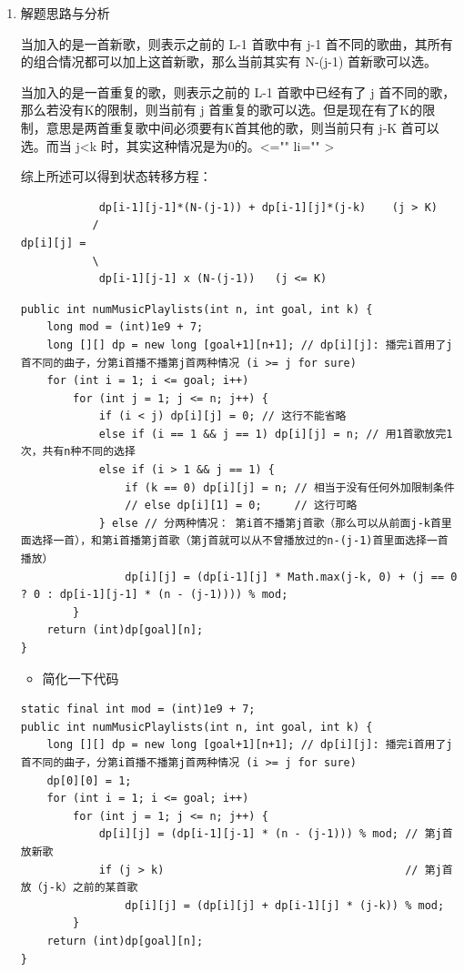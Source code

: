 \documentclass[9pt, b5paaper]{book}
\begin{document}
\begin{enumerate}
\item 解题思路与分析
\label{sec-1-5-1-1}

当加入的是一首新歌，则表示之前的 L-1 首歌中有 j-1 首不同的歌曲，其所有的组合情况都可以加上这首新歌，那么当前其实有 N-(j-1) 首新歌可以选。

当加入的是一首重复的歌，则表示之前的 L-1 首歌中已经有了 j 首不同的歌，那么若没有K的限制，则当前有 j 首重复的歌可以选。但是现在有了K的限制，意思是两首重复歌中间必须要有K首其他的歌，则当前只有 j-K 首可以选。而当 j<k 时，其实这种情况是为0的。<="" li="" >

综上所述可以得到状态转移方程：

\begin{verbatim}
            dp[i-1][j-1]*(N-(j-1)) + dp[i-1][j]*(j-k)    (j > K)	
           /	
dp[i][j] = 	
           \	
            dp[i-1][j-1] x (N-(j-1))   (j <= K)
\end{verbatim}
\begin{verbatim}
public int numMusicPlaylists(int n, int goal, int k) {
    long mod = (int)1e9 + 7;
    long [][] dp = new long [goal+1][n+1]; // dp[i][j]: 播完i首用了j首不同的曲子，分第i首播不播第j首两种情况 (i >= j for sure)
    for (int i = 1; i <= goal; i++) 
        for (int j = 1; j <= n; j++) {
            if (i < j) dp[i][j] = 0; // 这行不能省略   
            else if (i == 1 && j == 1) dp[i][j] = n; // 用1首歌放完1次，共有n种不同的选择
            else if (i > 1 && j == 1) {
                if (k == 0) dp[i][j] = n; // 相当于没有任何外加限制条件
                // else dp[i][1] = 0;     // 这行可略
            } else // 分两种情况： 第i首不播第j首歌（那么可以从前面j-k首里面选择一首），和第i首播第j首歌（第j首就可以从不曾播放过的n-(j-1)首里面选择一首播放）
                dp[i][j] = (dp[i-1][j] * Math.max(j-k, 0) + (j == 0 ? 0 : dp[i-1][j-1] * (n - (j-1)))) % mod;
        }
    return (int)dp[goal][n];
}
\end{verbatim}
\begin{itemize}
\item 简化一下代码
\end{itemize}
\begin{verbatim}
static final int mod = (int)1e9 + 7;
public int numMusicPlaylists(int n, int goal, int k) {
    long [][] dp = new long [goal+1][n+1]; // dp[i][j]: 播完i首用了j首不同的曲子，分第i首播不播第j首两种情况 (i >= j for sure)
    dp[0][0] = 1;
    for (int i = 1; i <= goal; i++) 
        for (int j = 1; j <= n; j++) {
            dp[i][j] = (dp[i-1][j-1] * (n - (j-1))) % mod; // 第j首放新歌
            if (j > k)                                     // 第j首放（j-k）之前的某首歌
                dp[i][j] = (dp[i][j] + dp[i-1][j] * (j-k)) % mod;
        }
    return (int)dp[goal][n];
}
\end{verbatim}
\end{enumerate}
\end{document}
